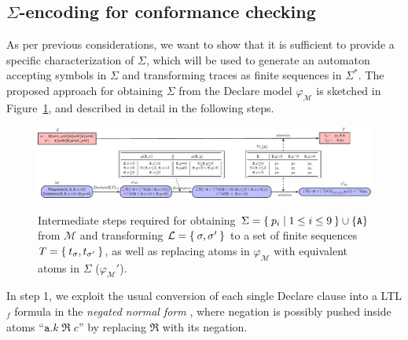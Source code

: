 

\subsection{$\Sigma$-encoding for conformance checking}\label{sec:dadtap}
As per previous considerations, we want to show that it is sufficient to provide a specific characterization of $\Sigma$, which will be used to generate an automaton accepting symbols in $\Sigma$ and transforming traces as finite sequences in $\Sigma^*$. The proposed approach for obtaining $\Sigma$ from the Declare model $\varphi_{\mathcal{M}}$ is sketched in Figure~\ref{fig:twoexamples}, and described in detail in the following steps.

\begin{figure}[!t]
	{\hspace{-1.3cm}\includegraphics[width=1.3\textwidth]{images/example_3}}
	\caption{Intermediate steps required for obtaining $\Sigma=\Set{p_i|1\leq i\leq 9}\cup\{\texttt{A}\}$ from $\mathcal{M}$ and transforming $\mathcal{L}=\Set{\sigma,\sigma'}$ to a set of finite sequences $T=\Set{t_\sigma,t_{\sigma'}}$, as well as replacing atoms in $\varphi_{\mathcal{M}}$ with equivalent atoms in $\Sigma$ ($\varphi_{\mathcal{M}}'$).}\label{fig:twoexamples}
\end{figure}
In step 1, we exploit the usual conversion of each single Declare clause into a LTL$_f$ formula in the \textit{negated normal form} \cite{LiPZVR20}, where negation is possibly pushed inside atoms ``$\texttt{a}.k\;\Re\; c$'' by replacing $\Re$ with its negation. 

